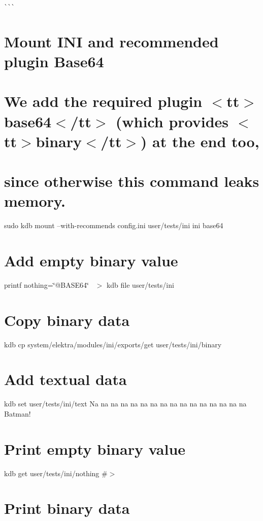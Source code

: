\`{}\`{}\`{} \hypertarget{autotoc_md292_autotoc_md298}{}\section{Mount I\+N\+I and recommended plugin Base64}\label{autotoc_md292_autotoc_md298}
\hypertarget{autotoc_md292_autotoc_md299}{}\section{We add the required plugin $<$tt$>$base64$<$/tt$>$ (which provides $<$tt$>$binary$<$/tt$>$) at the end too,}\label{autotoc_md292_autotoc_md299}
\hypertarget{autotoc_md292_autotoc_md300}{}\section{since otherwise this command leaks memory.}\label{autotoc_md292_autotoc_md300}
sudo kdb mount --with-\/recommends config.\+ini user/tests/ini ini base64\hypertarget{autotoc_md292_autotoc_md301}{}\section{Add empty binary value}\label{autotoc_md292_autotoc_md301}
printf \textquotesingle{}nothing=\char`\"{}@\+B\+A\+S\+E64\char`\"{}~\newline
\textquotesingle{} $>$ {\ttfamily kdb file user/tests/ini} \hypertarget{autotoc_md292_autotoc_md302}{}\section{Copy binary data}\label{autotoc_md292_autotoc_md302}
kdb cp system/elektra/modules/ini/exports/get user/tests/ini/binary \hypertarget{autotoc_md292_autotoc_md303}{}\section{Add textual data}\label{autotoc_md292_autotoc_md303}
kdb set user/tests/ini/text \textquotesingle{}Na na na na na na na na na na na na na na na na Batman!\textquotesingle{}\hypertarget{autotoc_md292_autotoc_md304}{}\section{Print empty binary value}\label{autotoc_md292_autotoc_md304}
kdb get user/tests/ini/nothing \#$>$\hypertarget{autotoc_md292_autotoc_md305}{}\section{Print binary data}\label{autotoc_md292_autotoc_md305}
